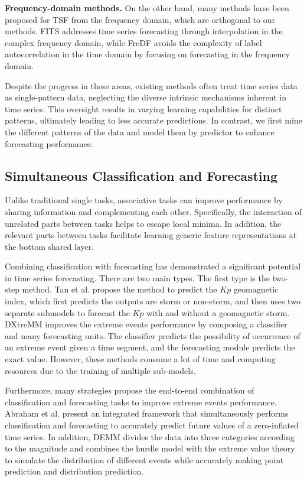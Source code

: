 \textbf{Frequency-domain methods.} On the other hand, many methods have been proposed for TSF from the frequency domain, which are orthogonal to our methods. FITS \cite{xu2023fits} addresses time series forecasting through interpolation in the complex frequency domain, while FreDF \cite{wang2024fredf} avoids the complexity of label autocorrelation in the time domain by focusing on forecasting in the frequency domain.

Despite the progress in these areas, existing methods often treat time series data as single-pattern data, neglecting the diverse intrinsic mechanisms inherent in time series. This oversight results in varying learning capabilities for distinct patterns, ultimately leading to less accurate predictions. In contrast, we first mine the different patterns of the data and model them by predictor to enhance forecasting performance.

\subsection{Simultaneous Classification and Forecasting}
Unlike traditional single tasks, associative tasks can improve performance by sharing information and complementing each other. Specifically, the interaction of unrelated parts between tasks helps to escape local minima. In addition, the relevant parts between tasks facilitate learning generic feature representations at the bottom shared layer.

Combining classification with forecasting has demonstrated a significant potential in time series forecasting.
There are two main types. The first type is the two-step method. Tan et al. \cite{tan2018geomagnetic} propose the method to predict the $Kp$ geomagnetic index, which first predicts the outputs are storm or non-storm, and then uses two separate submodels to forecast the $Kp$ with and without a geomagnetic storm.
DXtreMM \cite{abilasha2022deep} improves the extreme events performance by composing a classifier and many forecasting units. The classifier predicts the possibility of occurrence of an extreme event given a time segment, and the forecasting module predicts the exact value.
However, these methods consume a lot of time and computing resources due to the training of multiple sub-models.


Furthermore, many strategies propose the end-to-end combination of classification and forecasting tasks to improve extreme events performance. 
Abraham et al. \cite{abraham2010integrated} present an integrated framework that simultaneously performs classification and forecasting to accurately predict future values of a zero-inflated time series.
In addition, DEMM \cite{wilson2022beyond} divides the data into three categories according to the magnitude and combines the hurdle model with the extreme value theory to simulate the distribution of different events while accurately making point prediction and distribution prediction.

